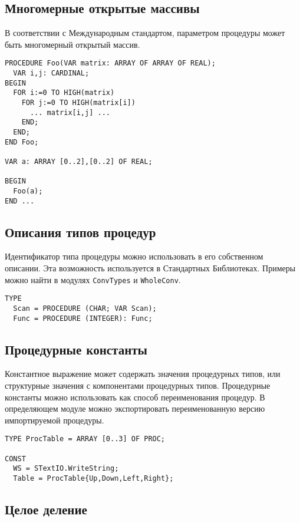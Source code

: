 \subsection{Многомерные открытые массивы}

В соответствии с Международным стандартом, параметром процедуры
может быть многомерный открытый массив.

\Example
\begin{verbatim}
PROCEDURE Foo(VAR matrix: ARRAY OF ARRAY OF REAL);
  VAR i,j: CARDINAL;
BEGIN
  FOR i:=0 TO HIGH(matrix)
    FOR j:=0 TO HIGH(matrix[i])
      ... matrix[i,j] ...
    END;
  END;
END Foo;

VAR a: ARRAY [0..2],[0..2] OF REAL;

BEGIN
  Foo(a);
END ...
\end{verbatim}

\subsection{Описания типов процедур}\label{m2:ISO:proc_dcl}

Идентификатор типа процедуры можно использовать в его 
собственном описании. Эта возможность используется в 
Стандартных Библиотеках. Примеры можно найти в модулях
{\tt ConvTypes} и {\tt WholeConv}.

\Example
\begin{verbatim}
TYPE
  Scan = PROCEDURE (CHAR; VAR Scan);
  Func = PROCEDURE (INTEGER): Func;
\end{verbatim}

\subsection{Процедурные константы}\label{m2:ISO:proc_const}

Константное выражение может содержать значения процедурных типов,
или структурные значения с компонентами процедурных типов.
Процедурные константы можно использовать как способ переименования 
процедур. В определяющем модуле можно экспортировать переименованную
версию импортируемой процедуры.

\Examples
\begin{verbatim}
TYPE ProcTable = ARRAY [0..3] OF PROC;

CONST
  WS = STextIO.WriteString;
  Table = ProcTable{Up,Down,Left,Right};
\end{verbatim}

\subsection{Целое деление}\label{m2:ISO:rem}

